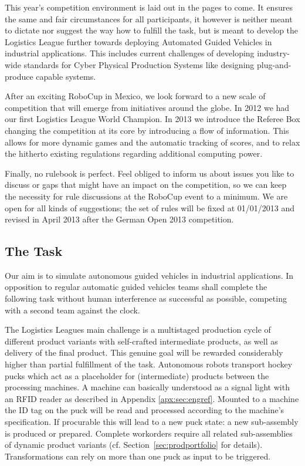 \documentclass[12pt,twoside]{article}
\newcommand{\refsec}[1]{Section~\ref{#1}}
\begin{document}
This year's competition environment is laid out in the pages to come.
It ensures the same and fair circumstances for all participants, it
however is neither meant to dictate nor suggest the way how to fulfill
the task, but is meant to develop the Logistics League further towards deploying
Automated Guided Vehicles in industrial applications. This includes current
challenges of developing industry-wide standards for Cyber Physical Production
Systems like designing plug-and-produce capable systems.

After an exciting RoboCup in Mexico, we look forward to a new scale of
competition that will emerge from initiatives around the globe. In
2012 we had our first Logistics League World Champion.  In 2013 we
introduce the Referee Box changing the competition at its core by
introducing a flow of information.  This allows for more dynamic games
and the automatic tracking of scores, and to relax the hitherto
existing regulations regarding additional computing power.

Finally, no rulebook is perfect. Feel obliged to inform us about
issues you like to discuss or gaps that might have an impact on the
competition, so we can keep the necessity for rule discussions at the
RoboCup event to a minimum. We are open for all kinds of suggestions;
the set of rules will be fixed at 01/01/2013 and revised in April 2013
after the German Open 2013 competition.

\subsection{The Task}
\label{sec:task}

Our aim is to simulate autonomous guided vehicles in industrial applications. 
In opposition to regular automatic guided vehicles teams shall complete the following task
without human interference as successful as possible, competing with a second team
against the clock.

The Logistics Leagues main challenge is a multistaged production cycle of
different product variants with self-crafted intermediate products, as well as delivery of
the final product. This genuine goal will be rewarded considerably higher
than partial fulfillment of the task.
Autonomous robots transport hockey pucks which act as a placeholder
for (intermediate) products between the processing
machines. A machine can basically understood as a signal light with an RFID reader
as described in Appendix \ref{apx:sec:engref}. Mounted to a machine the ID tag 
on the puck will be read and processed according to the machine's specification.
If procurable this will lead to a new puck state: a new sub-assembly is produced or prepared.
Complete workorders require all related sub-assemblies of dynamic product variants (cf. \refsec{sec:prodportfolio} for details). Transformations can rely on more than one puck as input
to be triggered.
\end{document}
